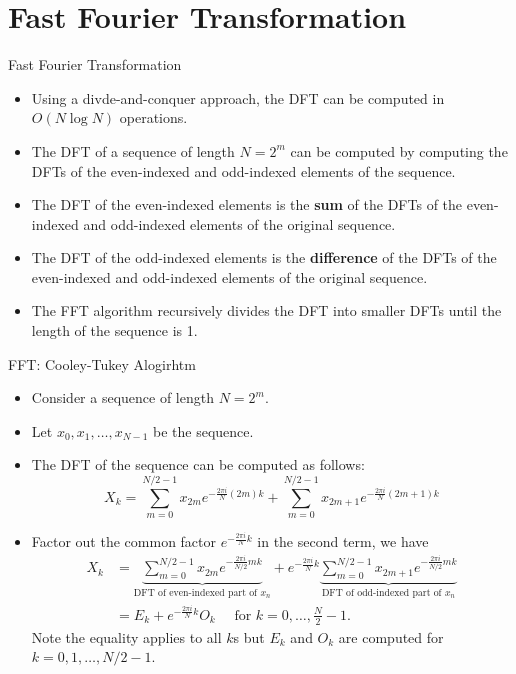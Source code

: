 \documentclass{beamer}
\newcommand{\beforeverb}{\footnotesize}
\newcommand{\afterverb}{\normalsize}
\begin{document}
\section{Fast Fourier Transformation}
\begin{frame}{Fast Fourier Transformation}
    \begin{itemize}
     \item Using a divde-and-conquer approach, the DFT can be computed in $O(N\log N)$ operations.
     \item The DFT of a sequence of length $N=2^m$ can be computed by computing the DFTs of the even-indexed and odd-indexed elements of the sequence.
     \item The DFT of the even-indexed elements is the \textbf{sum} of the DFTs of the even-indexed and odd-indexed elements of the original sequence.
     \item The DFT of the odd-indexed elements is the \textbf{difference} of the DFTs of the even-indexed and odd-indexed elements of the original sequence.
     \item The FFT algorithm recursively divides the DFT into smaller DFTs until the length of the sequence is 1.
    \end{itemize}

\end{frame}
\begin{frame}{FFT: Cooley-Tukey Alogirhtm}
    \begin{itemize}
        \item Consider a sequence of length $N=2^m$.
        \item Let $x_0,x_1,\ldots,x_{N-1}$ be the sequence.
        \item The DFT of the sequence can be computed as follows:
        \beforeverb
        \[
            X_k=\sum_{m=0}^{N / 2-1} x_{2 m} e^{-\frac{2 \pi i}{N}(2 m) k}+\sum_{m=0}^{N / 2-1} x_{2 m+1} e^{-\frac{2 \pi i}{N}(2 m+1) k}
        \]
        \afterverb
        \item Factor out the common factor $e^{-\frac{2 \pi i}{N} k}$ in the second term, we have
        \beforeverb
        \begin{align*}
            X_k&=\underbrace{\sum_{m=0}^{N / 2-1} x_{2 m} e^{-\frac{2 \pi i}{N / 2} m k}}_{\text {DFT of even-indexed part of } x_n}+e^{-\frac{2 \pi i}{N} k} \underbrace{\sum_{m=0}^{N / 2-1} x_{2 m+1} e^{-\frac{2 \pi i}{N / 2} m k}}_{\text {DFT of odd-indexed part of } x_n}\\
            &=E_k+e^{-\frac{2 \pi i}{N} k} O_k \quad \text { for } k=0, \ldots, \frac{N}{2}-1 .
        \end{align*}
        \afterverb
        Note the equality applies to all $k$s but $E_k$ and $O_k$ are computed for $k=0,1,\ldots,N/2-1$.
    \end{itemize}
\end{frame}
\end{document}
